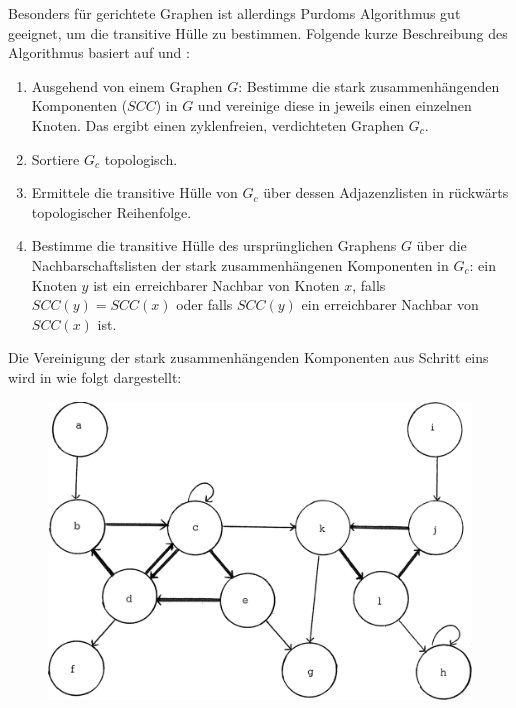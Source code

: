Besonders für gerichtete Graphen ist allerdings Purdoms Algorithmus gut geeignet, um die transitive Hülle zu bestimmen. Folgende kurze Beschreibung des Algorithmus basiert auf \cite{purdom1970transitive} und \cite[Seite 77]{dar1993augmenting}: 

\begin{enumerate}
\item Ausgehend von einem Graphen $G$: Bestimme die stark zusammenhängenden Komponenten ($SCC$) in $G$ und vereinige diese in jeweils einen einzelnen Knoten. Das ergibt einen zyklenfreien, verdichteten Graphen $G_c$.  %
\item Sortiere $G_c$ topologisch. %
\item Ermittele die transitive Hülle von $G_c$ über dessen Adjazenzlisten in rückwärts topologischer Reihenfolge. %
\item Bestimme die transitive Hülle des ursprünglichen Graphens $G$ über die Nachbarschaftslisten der stark zusammenhängenen Komponenten in $G_c$: ein Knoten $y$ ist ein erreichbarer Nachbar von Knoten $x$, falls $SCC(y) = SCC(x)$ oder falls $SCC(y)$ ein erreichbarer Nachbar von $SCC(x)$ ist. %
\end{enumerate}

Die Vereinigung der stark zusammenhängenden Komponenten aus Schritt eins wird in \cite{purdom1970transitive} wie folgt dargestellt: 

\begin{figure}[H]
    \centering
    \includegraphics[width=.6\linewidth]{../img/purdom_g1.png}
\end{figure}

